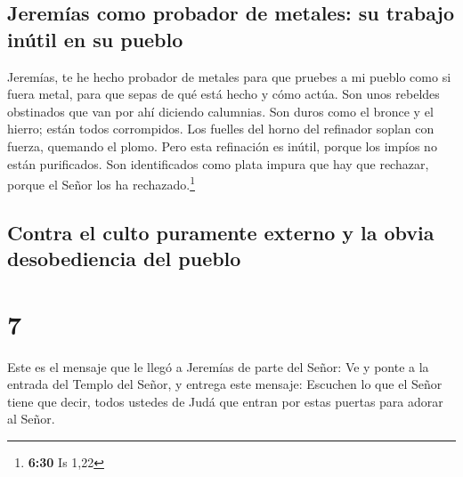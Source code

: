 \hypertarget{jeremuxedas-como-probador-de-metales-su-trabajo-inuxfatil-en-su-pueblo}{%
\subsection{Jeremías como probador de metales: su trabajo inútil en su
pueblo}\label{jeremuxedas-como-probador-de-metales-su-trabajo-inuxfatil-en-su-pueblo}}

 Jeremías, te he hecho probador de metales para que
pruebes a mi pueblo como si fuera metal, para que sepas de qué está
hecho y cómo actúa.  Son unos rebeldes obstinados que van
por ahí diciendo calumnias. Son duros como el bronce y el hierro; están
todos corrompidos.  Los fuelles del horno del refinador
soplan con fuerza, quemando el plomo. Pero esta refinación es inútil,
porque los impíos no están purificados.  Son
identificados como plata impura que hay que rechazar, porque el Señor
los ha rechazado.\footnote{\textbf{6:30} Is 1,22}

\hypertarget{contra-el-culto-puramente-externo-y-la-obvia-desobediencia-del-pueblo}{%
\subsection{Contra el culto puramente externo y la obvia desobediencia
del
pueblo}\label{contra-el-culto-puramente-externo-y-la-obvia-desobediencia-del-pueblo}}

\hypertarget{section-6}{%
\section{7}\label{section-6}}

 Este es el mensaje que le llegó a Jeremías de parte del
Señor:  Ve y ponte a la entrada del Templo del Señor, y
entrega este mensaje: Escuchen lo que el Señor tiene que decir, todos
ustedes de Judá que entran por estas puertas para adorar al Señor.

